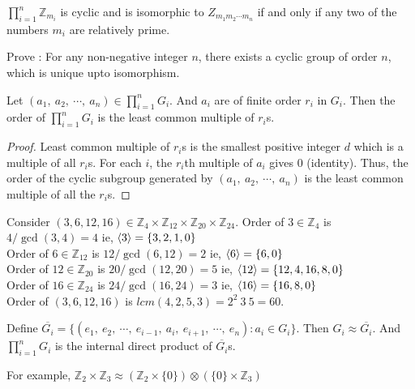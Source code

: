 \begin{corollary}
	$\prod\limits_{i = 1}^n \mathbb{Z}_{m_i}$ is cyclic and is isomorphic to $Z_{m_1m_2\cdots m_n}$ if and only if any two of the numbers $m_i$ are relatively prime.
\end{corollary}

\begin{question}
	Prove : For any non-negative integer $n$, there exists a cyclic group of order $n$, which is unique upto isomorphism.
\end{question}

\begin{theorem}
	Let $(a_1,\ a_2,\ \cdots,\ a_n) \in \prod\limits_{i = 1}^n G_i$. And $a_i$ are of finite order $r_i$ in $G_i$. Then the order of $\prod\limits_{i = 1}^n G_i$ is the least common multiple of $r_i$s.
\end{theorem}
\begin{proof}
	Least common multiple of $r_i$s is the smallest positive integer $d$ which is a multiple of all $r_i$s.
	For each $i$, the $r_i$th multiple of $a_i$ gives $0$ (identity).
	Thus, the order of the cyclic subgroup generated by $(a_1,\ a_2,\ \cdots,\ a_n)$ is the least common multiple of all the $r_i$s.
\end{proof}
\begin{remark}
	Consider $(3,6,12,16) \in \mathbb{Z}_4 \times \mathbb{Z}_{12} \times \mathbb{Z}_{20} \times \mathbb{Z}_{24}$.
	Order of $3 \in \mathbb{Z}_4$ is ${4}/{\gcd(3,4)} = 4$ ie, $\langle 3\rangle = \{ 3,2,1,0 \}$\\
	Order of $6 \in \mathbb{Z}_{12}$ is ${12}/{\gcd(6,12)} = 2$ ie, $\langle 6\rangle = \{ 6,0 \}$\\
	Order of $12 \in \mathbb{Z}_{20}$ is ${20}/{\gcd(12,20)} = 5$ ie, $\langle 12\rangle = \{ 12,4,16,8,0 \}$\\
	Order of $16 \in \mathbb{Z}_{24}$ is ${24}/{\gcd(16,24)} = 3$ ie, $\langle 16\rangle = \{ 16,8,0 \}$\\
	Order of $(3,6,12,16)$ is $lcm(4,2,5,3) = 2^2\ 3\ 5 = 60$.
\end{remark}

\begin{remark}
	Define $\overline{G_i} = \{ (e_1,\ e_2,\ \cdots,\ e_{i-1},\ a_i,\ e_{i+1},\ \cdots,\ e_n) : a_i \in G_i\}$.
	Then $G_i \approx \overline{G_i}$.
	And $\prod\limits_{i=1}^n G_i$ is the internal direct product of $\overline{G_i}$s.

	For example, $\mathbb{Z}_2 \times \mathbb{Z}_3 \approx \left( \mathbb{Z}_2 \times \{ 0 \} \right) \otimes \left( \{ 0 \} \times \mathbb{Z}_3 \right)$
\end{remark}


